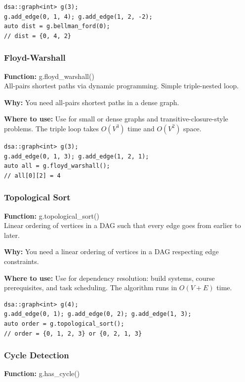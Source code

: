 \documentclass[11pt]{article}
\begin{document}
\begin{lstlisting}
dsa::graph<int> g(3);
g.add_edge(0, 1, 4); g.add_edge(1, 2, -2);
auto dist = g.bellman_ford(0);
// dist = {0, 4, 2}
\end{lstlisting}

\subsubsection{Floyd-Warshall}
\textbf{Function:} g.floyd\_warshall()\\

All-pairs shortest paths via dynamic programming. Simple triple-nested loop.

\textbf{Why:} You need all-pairs shortest paths in a dense graph. \par \textbf{Where to use:} Use for small or dense graphs and transitive-closure-style problems. The triple loop takes \(O(V^3)\) time and \(O(V^2)\) space.

\begin{lstlisting}
dsa::graph<int> g(3);
g.add_edge(0, 1, 3); g.add_edge(1, 2, 1);
auto all = g.floyd_warshall();
// all[0][2] = 4
\end{lstlisting}

\subsubsection{Topological Sort}
\textbf{Function:} g.topological\_sort()\\

Linear ordering of vertices in a DAG such that every edge goes from earlier to later.

\textbf{Why:} You need a linear ordering of vertices in a DAG respecting edge constraints. \par \textbf{Where to use:} Use for dependency resolution: build systems, course prerequisites, and task scheduling. The algorithm runs in \(O(V+E)\) time.

\begin{lstlisting}
dsa::graph<int> g(4);
g.add_edge(0, 1); g.add_edge(0, 2); g.add_edge(1, 3);
auto order = g.topological_sort();
// order = {0, 1, 2, 3} or {0, 2, 1, 3}
\end{lstlisting}

\subsubsection{Cycle Detection}
\textbf{Function:} g.has\_cycle()\\
\end{document}

